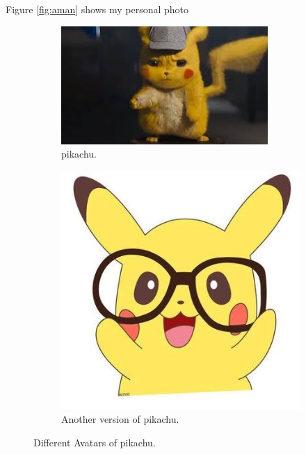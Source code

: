 \documentclass{article}
\begin{document}
  Figure \ref{fig:aman} shows my personal photo
  \begin{figure}[h!]
    \centering
    \begin{subfigure}[t!]{0.4\linewidth}
    \includegraphics[width=\linewidth]{anime.jpeg}
    \caption{pikachu.}
  \end{subfigure}
  \begin{subfigure}[t!]{0.4\linewidth}
    \includegraphics[width=\linewidth]{pikachu.jpg}
    \caption{Another version of pikachu.}
  \end{subfigure}
  \caption{Different Avatars of pikachu.}
  \label{fig:pikachu}
  \end{figure}
\end{document}
